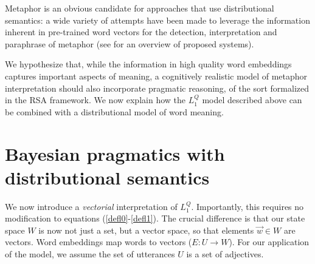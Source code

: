 \documentclass[9pt,twocolumn,twoside,lineno]{pnas-new}
\newcommand{\Listener}{L}
\newcommand{\QLONE}{\Listener_{{1}}^{{Q}}}
\begin{document}
		

	Metaphor is an obvious candidate for approaches that use distributional semantics: a wide variety of attempts have been made to leverage the information inherent in pre-trained word vectors for the detection, interpretation and paraphrase of metaphor (see \cite{shutova2016design} for an overview of proposed systems).

	We hypothesize that, while the information in high quality word embeddings captures important aspects of meaning, a cognitively realistic model of metaphor interpretation should also incorporate pragmatic reasoning, of the sort formalized in the RSA framework. We now explain how the $\QLONE$ model described above can be combined with a distributional model of word meaning.

	\section{Bayesian pragmatics with distributional semantics} \label{bayesdist}


	We now introduce a \emph{vectorial} interpretation of $\QLONE$. Importantly, this requires no modification to equations (\ref{defl0}-\ref{defl1}). The crucial difference is that our state space $W$ is now not just a set, but a vector space, so that elements $\overrightarrow{w}\in W$ are vectors. Word embeddings map words to vectors ($E : U\to W$).
	For our application of the model, we assume the set of utterances $U$ is a set of adjectives. 

		
\end{document}
